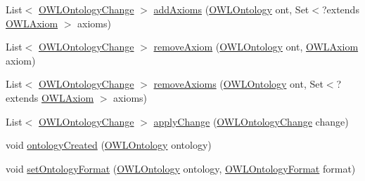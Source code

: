 \begin{DoxyCompactItemize}
\item 
List$<$ \hyperlink{classorg_1_1semanticweb_1_1owlapi_1_1model_1_1_o_w_l_ontology_change}{O\-W\-L\-Ontology\-Change} $>$ \hyperlink{classuk_1_1ac_1_1manchester_1_1cs_1_1owl_1_1owlapi_1_1_o_w_l_ontology_manager_impl_a0901039a86488203fab61c6bf160acff}{add\-Axioms} (\hyperlink{interfaceorg_1_1semanticweb_1_1owlapi_1_1model_1_1_o_w_l_ontology}{O\-W\-L\-Ontology} ont, Set$<$?extends \hyperlink{interfaceorg_1_1semanticweb_1_1owlapi_1_1model_1_1_o_w_l_axiom}{O\-W\-L\-Axiom} $>$ axioms)
\item 
List$<$ \hyperlink{classorg_1_1semanticweb_1_1owlapi_1_1model_1_1_o_w_l_ontology_change}{O\-W\-L\-Ontology\-Change} $>$ \hyperlink{classuk_1_1ac_1_1manchester_1_1cs_1_1owl_1_1owlapi_1_1_o_w_l_ontology_manager_impl_abcac0ced2f6c3becb10b05140be0cd78}{remove\-Axiom} (\hyperlink{interfaceorg_1_1semanticweb_1_1owlapi_1_1model_1_1_o_w_l_ontology}{O\-W\-L\-Ontology} ont, \hyperlink{interfaceorg_1_1semanticweb_1_1owlapi_1_1model_1_1_o_w_l_axiom}{O\-W\-L\-Axiom} axiom)
\item 
List$<$ \hyperlink{classorg_1_1semanticweb_1_1owlapi_1_1model_1_1_o_w_l_ontology_change}{O\-W\-L\-Ontology\-Change} $>$ \hyperlink{classuk_1_1ac_1_1manchester_1_1cs_1_1owl_1_1owlapi_1_1_o_w_l_ontology_manager_impl_a252e96d8204088211d4e3a1854ad59f8}{remove\-Axioms} (\hyperlink{interfaceorg_1_1semanticweb_1_1owlapi_1_1model_1_1_o_w_l_ontology}{O\-W\-L\-Ontology} ont, Set$<$?extends \hyperlink{interfaceorg_1_1semanticweb_1_1owlapi_1_1model_1_1_o_w_l_axiom}{O\-W\-L\-Axiom} $>$ axioms)
\item 
List$<$ \hyperlink{classorg_1_1semanticweb_1_1owlapi_1_1model_1_1_o_w_l_ontology_change}{O\-W\-L\-Ontology\-Change} $>$ \hyperlink{classuk_1_1ac_1_1manchester_1_1cs_1_1owl_1_1owlapi_1_1_o_w_l_ontology_manager_impl_a26de473166c5f947cc8a456b84162e36}{apply\-Change} (\hyperlink{classorg_1_1semanticweb_1_1owlapi_1_1model_1_1_o_w_l_ontology_change}{O\-W\-L\-Ontology\-Change} change)
\item 
void \hyperlink{classuk_1_1ac_1_1manchester_1_1cs_1_1owl_1_1owlapi_1_1_o_w_l_ontology_manager_impl_ad0f200fc68cfc26ccbd590ec21ea05c7}{ontology\-Created} (\hyperlink{interfaceorg_1_1semanticweb_1_1owlapi_1_1model_1_1_o_w_l_ontology}{O\-W\-L\-Ontology} ontology)
\item 
void \hyperlink{classuk_1_1ac_1_1manchester_1_1cs_1_1owl_1_1owlapi_1_1_o_w_l_ontology_manager_impl_accf63d16fcddeac1215faf430526b5b6}{set\-Ontology\-Format} (\hyperlink{interfaceorg_1_1semanticweb_1_1owlapi_1_1model_1_1_o_w_l_ontology}{O\-W\-L\-Ontology} ontology, \hyperlink{classorg_1_1semanticweb_1_1owlapi_1_1model_1_1_o_w_l_ontology_format}{O\-W\-L\-Ontology\-Format} format)

\end{DoxyCompactItemize}
